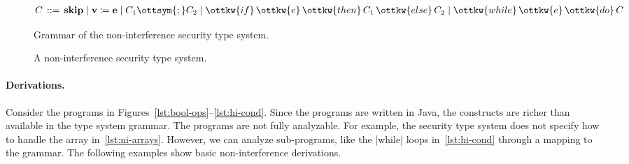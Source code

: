 \begin{figure}[t]
\centering\begin{align*}
C \, ::={ }& \, \mathbf{skip} \mid
\mathbf{v}\coloneqq{}\mathbf{e} \mid
\nonterm C_{{\mathrm{1}}}  \ottsym{;}  \nonterm C_{{\mathrm{2}}} \mid
\ottkw{if} \, \ottkw{e} \, \ottkw{then} \, \nonterm C_{{\mathrm{1}}} \, \ottkw{else} \, \nonterm C_{{\mathrm{2}}} \mid
\ottkw{while} \, \ottkw{e} \, \ottkw{do} \, \nonterm C
\end{align*}
\caption[Grammar of the non-interference security type system]
{Grammar of the non-interference security type system.}\label{fig:ni-syntax}
\end{figure}
\begin{figure}[t]
\centering{}
\centering{}
\caption[Non-interference security type system]{A non-interference security type system.}\label{fig:ni-types}
\end{figure}

\paragraph*{Derivations.}
Consider the programs in Figures~\ref{lst:bool-ops}--\ref{lst:hi-cond}.
Since the programs are written in Java, the constructs are richer than available in the type system grammar.
The programs are not fully analyzable.
For example, the {security type system} does not specify how to handle the array in~\autoref{lst:ni-arrays}.
However, we can analyze sub-programs, like the \pr|while| loops in~\autoref{lst:hi-cond} through a mapping to the grammar.
The following examples show basic non-interference derivations.


